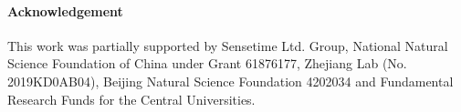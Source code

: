 \documentclass[final]{cvpr}
\begin{document}
\vspace{-4mm}
\paragraph{Acknowledgement} This work was partially supported by Sensetime Ltd. Group, National Natural Science Foundation of China under Grant 61876177, Zhejiang Lab (No. 2019KD0AB04),  Beijing Natural Science Foundation 4202034 and  Fundamental Research Funds for the Central Universities.
{\small


}
\end{document}
